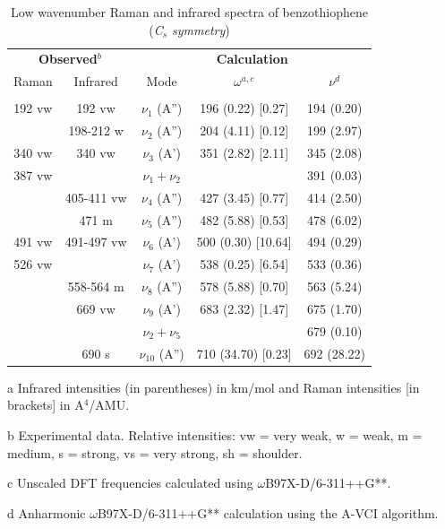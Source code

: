 	\begin{table}[H]
		\begin{center}
			\caption[Low wavenumber Raman and infrared spectra of benzothiophene]{Low wavenumber Raman and infrared spectra of benzothiophene (\textit{C$_s$ symmetry})} \label{tableP1-1}
			\begin{threeparttable}[b]
				\begin{tabular}{c c c c c}
					\toprule
					\multicolumn{2}{p{5cm}}{\centering \textbf{Observed$^{b}$}} & \multicolumn{3}{p{10cm}}{\centering \textbf{Calculation}} \\
					Raman & Infrared & Mode & $\omega^{a,c}$ & $\nu^{d}$ \\
					\midrule
					&  &   &    &   \\
					192 vw & 192 vw & $\nu_{1}$ (A”) & 196 (0.22) [0.27] & 194 (0.20)\\
					& 198-212 w & $\nu_{2}$ (A”) & 204 (4.11) [0.12] & 199 (2.97) \\
					340 vw & 340 vw & $\nu_{3}$ (A') & 351 (2.82) [2.11] & 345 (2.08) \\
					387 vw &   & $\nu_{1} + \nu_{2}$ &  & 391 (0.03) \\
					& 405-411 vw & $\nu_{4}$ (A”) & 427 (3.45) [0.77] & 414 (2.50)\\
					& 471 m & $\nu_{5}$ (A”) & 482 (5.88) [0.53] & 478 (6.02) \\
					491 vw & 491-497 vw & $\nu_{6}$ (A') & 500 (0.30) [10.64] & 494 (0.29) \\
					526 vw &  & $\nu_{7}$ (A') & 538 (0.25) [6.54] & 533 (0.36) \\
					& 558-564 m & $\nu_{8}$ (A”) & 578 (5.88) [0.70] & 563 (5.24)\\
					& 669 vw & $\nu_{9}$ (A') & 683 (2.32) [1.47] & 675 (1.70)\\
					&  & $\nu_{2} + \nu_{5}$ &  & 679 (0.10) \\
					& 690 s & $\nu_{10}$ (A”) & 710 (34.70) [0.23] & 692 (28.22)\\
					\bottomrule 
				\end{tabular}
				
				\begin{tablenotes}
					\item[a] Infrared intensities (in parentheses) in km/mol and Raman intensities [in brackets] in A$^{4}$/AMU.
					\item[b] Experimental data. Relative intensities: vw = very weak, w = weak, m = medium, s = strong, vs = very strong, sh = shoulder.
					\item[c] Unscaled DFT frequencies calculated using $\omega$B97X-D/6-311++G**.
					\item[d] Anharmonic $\omega$B97X-D/6-311++G** calculation using the A-VCI algorithm\cite{garnier2016adaptive}.
				\end{tablenotes}
			\end{threeparttable}
		\end{center}
	\end{table}
	
